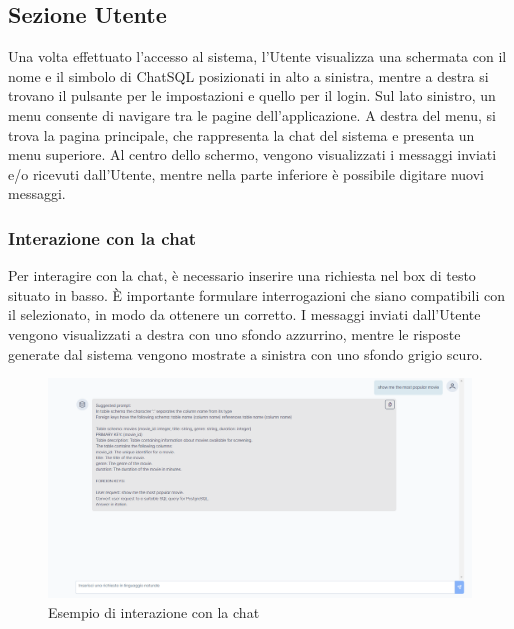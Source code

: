 \subsection{Sezione Utente}
\label{sec:sezUtente}

\par Una volta effettuato l'accesso al sistema, l'Utente visualizza una schermata con il nome e il simbolo di ChatSQL posizionati in alto a sinistra, mentre a destra si trovano il pulsante per le impostazioni e quello per il login. Sul lato sinistro, un menu consente di navigare tra le pagine dell'applicazione. A destra del menu, si trova la pagina principale, che rappresenta la chat del sistema e presenta un menu superiore. Al centro dello schermo, vengono visualizzati i messaggi inviati e/o ricevuti dall'Utente, mentre nella parte inferiore è possibile digitare nuovi messaggi.

\subsubsection{Interazione con la chat} \label{sec:interazione-chat}

\par Per interagire con la chat, è necessario inserire una richiesta nel box di testo situato in basso. È importante formulare interrogazioni che siano compatibili con il  selezionato, in modo da ottenere un  corretto. I messaggi inviati dall'Utente vengono visualizzati a destra con uno sfondo azzurrino, mentre le risposte generate dal sistema vengono mostrate a sinistra con uno sfondo grigio scuro.

\begin{figure}[H]
  \centering
  \includegraphics[width=\textwidth]{assets/chat_example.png}
  \caption{Esempio di interazione con la chat}
\end{figure}

